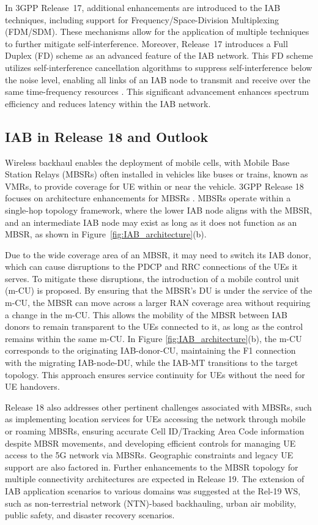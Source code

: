 \documentclass[lettersize,journal]{IEEEtran}
\begin{document}
In 3GPP Release~17, additional enhancements are introduced to the IAB techniques, including support for Frequency/Space-Division Multiplexing (FDM/SDM). These mechanisms allow for the application of multiple techniques to further mitigate self-interference. Moreover, Release~17 introduces a Full Duplex (FD) scheme as an advanced feature of the IAB network. This FD scheme utilizes self-interference cancellation algorithms to suppress self-interference below the noise level, enabling all links of an IAB node to transmit and receive over the same time-frequency resources \cite{IAB-chae}. This significant advancement enhances spectrum efficiency and reduces latency within the IAB network.

\subsection{IAB in Release 18 and Outlook}

Wireless backhaul enables the deployment of mobile cells, with Mobile Base Station Relays (MBSRs) often installed in vehicles like buses or trains, known as VMRs, to provide coverage for UE within or near the vehicle. 3GPP Release 18 focuses on architecture enhancements for MBSRs \cite{TR-23.700}. MBSRs operate within a single-hop topology framework, where the lower IAB node aligns with the MBSR, and an intermediate IAB node may exist as long as it does not function as an MBSR, as shown in Figure~\ref{fig:IAB_architecture}(b).

Due to the wide coverage area of an MBSR, it may need to switch its IAB donor, which can cause disruptions to the PDCP and RRC connections of the UEs it serves. To mitigate these disruptions, the introduction of a mobile control unit (m-CU) is proposed. By ensuring that the MBSR's DU is under the service of the m-CU, the MBSR can move across a larger RAN coverage area without requiring a change in the m-CU. This allows the mobility of the MBSR between IAB donors to remain transparent to the UEs connected to it, as long as the control remains within the same m-CU. In Figure \ref{fig:IAB_architecture}(b), the m-CU corresponds to the originating IAB-donor-CU, maintaining the F1 connection with the migrating IAB-node-DU, while the IAB-MT transitions to the target topology. This approach ensures service continuity for UEs without the need for UE handovers.

Release 18 also addresses other pertinent challenges associated with MBSRs, such as implementing location services for UEs accessing the network through mobile or roaming MBSRs, ensuring accurate Cell ID/Tracking Area Code information despite MBSR movements, and developing efficient controls for managing UE access to the 5G network via MBSRs. Geographic constraints and legacy UE support are also factored in. Further enhancements to the MBSR topology for multiple connectivity architectures are expected in Release 19. The extension of IAB application scenarios to various domains was suggested at the Rel-19 WS, such as non-terrestrial network (NTN)-based backhauling, urban air mobility, public safety, and disaster recovery scenarios.
\end{document}
